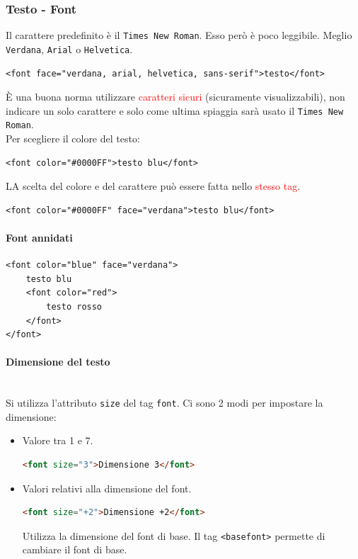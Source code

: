 \documentclass{article}
\begin{document}
\subsubsection{Testo - Font}
Il carattere predefinito è il \texttt{Times New Roman}. Esso però è poco leggibile. Meglio \texttt{Verdana}, \texttt{Arial} o \texttt{Helvetica}.
\begin{lstlisting}[style=htmlstyle]
<font face="verdana, arial, helvetica, sans-serif">testo</font>
\end{lstlisting}
È una buona norma utilizzare \textcolor{red}{caratteri sicuri} (sicuramente visualizzabili), non indicare un solo carattere e solo come ultima spiaggia sarà usato il \texttt{Times New Roman}.
\\ Per scegliere il colore del testo:
\begin{lstlisting}[style=htmlstyle]
<font color="#0000FF">testo blu</font>
\end{lstlisting}
LA scelta del colore e del carattere può essere fatta nello \textcolor{red}{stesso tag}.
\begin{lstlisting}[style=htmlstyle]
<font color="#0000FF" face="verdana">testo blu</font>
\end{lstlisting}
\paragraph{Font annidati} \mbox{}
\begin{lstlisting}[style=htmlstyle]
<font color="blue" face="verdana">
    testo blu
    <font color="red">
        testo rosso
    </font>
</font>
\end{lstlisting}
\paragraph{Dimensione del testo} \mbox{} \\
Si utilizza l'attributo \texttt{size} del tag \texttt{font}. Ci sono 2 modi per impostare la dimensione:
\begin{itemize}
    \item Valore tra 1 e 7.
          \begin{lstlisting}[language=html]
    <font size="3">Dimensione 3</font>
    \end{lstlisting}
    \item Valori relativi alla dimensione del font.
          \begin{lstlisting}[language=html]
    <font size="+2">Dimensione +2</font>
    \end{lstlisting}
          Utilizza la dimensione del font di base. Il tag \texttt{<basefont>} permette di cambiare il font di base.
\end{itemize}
\end{document}
